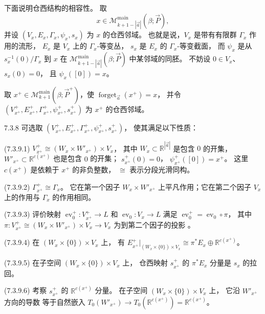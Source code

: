 下面说明仓西结构的相容性。
取
\[
x\in\mathcal M^{\mathrm{main}}_{k+1-|\vec a|}
(\beta;\vec P),
\]
并设
$(V_x,E_x,\Gamma_x,\psi_x,s_x)$
为 $x$ 的仓西邻域。
也就是说，$V_x$ 是带有有限群
$\Gamma_x$ 作用的流形，
$E_x$ 是 $V_x$ 上的 $\Gamma_x$-等变丛，
$s_x$ 是 $E_x$ 的 $\Gamma_x$-等变截面，
而 $\psi_x$ 是从 $s_x^{-1}(0)/\Gamma_x$
到 $x$ 在
$\mathcal M^{\mathrm{main}}_{k+1-|\vec a|}
(\beta;\vec P)$ 中某邻域的同胚。
不妨设 $0\in V_x$、$s_x(0)=0$，
且 $\psi_x([0])=x$。

取
$x^+\in\mathcal M^{\mathrm{main}}_{k+1}
(\beta;\vec P^+)$，使
$\operatorname{forget}_{\vec a}(x^+)=x$，
并令
$(V_{x^+}^+,E_{x^+}^+,\Gamma_{x^+}^+,
\psi_{x^+}^+,s_{x^+}^+)$
为 $x^+$ 的仓西邻域。

\begin{lemma}{7.3.8}\label{lem:7-3-8}
可选取
$(V_{x^+}^+,E_{x^+}^+,\Gamma_{x^+}^+,
\psi_{x^+}^+,s_{x^+}^+)$，
使其满足以下性质：

\noindent\textup{(7.3.9.1)}\quad
$V_{x^+}^+\cong(W_x\times W'_{x^+})\times V_x$，
其中 $W_x\subset\mathbb R^{|\vec a|}$
是包含 $0$ 的开集，
$W'_{x^+}\subset\mathbb R^{c(x^+)}$
也是包含 $0$ 的开集；
$s_{x^+}^+(0)=0$，
$\psi_{x^+}^+([0])=x^+$。
这里 $c(x^+)$ 是依赖于 $x^+$ 的非负整数，
$\cong$ 表示分段光滑同构。

\noindent\textup{(7.3.9.2)}\quad
$\Gamma_{x^+}^+\cong\Gamma_x$。
它在第一个因子 $W_x\times W'_{x^+}$
上平凡作用；它在第二个因子 $V_x$
上的作用与 $\Gamma_x$ 的作用相同。

\noindent\textup{(7.3.9.3)}\quad
评价映射
$\operatorname{ev}_0^+\colon V_{x^+}^+\to L$
和 $\operatorname{ev}_0\colon V_x\to L$
满足
$\operatorname{ev}_0^+
=\operatorname{ev}_0\circ\pi$，
其中
$\pi\colon V_{x^+}^+
\cong(W_x\times W'_{x^+})\times V_x
\to V_x$
为到第二个因子的投影
。

\noindent\textup{(7.3.9.4)}\quad
在 $(W_x\times\{0\})\times V_x$ 上，
有
$E_{x^+}^+|_{(W_x\times\{0\})\times V_x}
\cong\pi^*E_x\oplus\mathbb R^{c(x^+)}$。

\noindent\textup{(7.3.9.5)}\quad
在子空间 $(W_x\times\{0\})\times V_x$ 上，
仓西映射 $s_{x^+}^+$ 的
$\pi^*E_x$ 分量是 $s_x$ 的拉回。

\noindent\textup{(7.3.9.6)}\quad
考察 $s_{x^+}^+$ 的
$\mathbb R^{c(x^+)}$ 分量。
在子空间 $(W_x\times\{0\})\times V_x$ 上，
它沿 $W'_{x^+}$ 方向的导数
等于自然嵌入
$T_0(W'_{x^+})\to
T_0(\mathbb R^{c(x^+)})
=\mathbb R^{c(x^+)}$。
\end{lemma}


